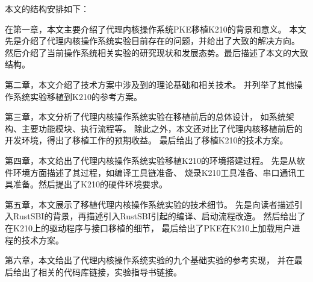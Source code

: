 本文的结构安排如下：

在第一章，本文主要介绍了代理内核操作系统PKE移植K210的背景和意义。
本文先是介绍了代理内核操作系统实验目前存在的问题，并给出了大致的解决方向。
然后介绍了当前操作系统相关实验的研究现状和发展态势。最后描述了本文的大致结构。

第二章，本文介绍了技术方案中涉及到的理论基础和相关技术。
并列举了其他操作系统实验移植到K210的参考方案。

第三章，本文分析了代理内核操作系统实验在移植前后的总体设计，
如系统架构、主要功能模块、执行流程等。
除此之外，本文还对比了代理内核移植前后的开发环境，得出了移植工作的预期收益。
最后给出了移植K210的技术方案。

第四章，本文给出了代理内核操作系统实验移植K210的环境搭建过程。
先是从软件环境方面描述了其过程，如编译工具链准备、
烧录K210工具准备、串口通讯工具准备。然后提出了K210的硬件环境要求。

第五章，本文展示了移植代理内核操作系统实验的技术细节。
先是向读者描述引入RustSBI的背景，再描述引入RustSBI引起的编译、启动流程改造。
然后给出了在K210上的驱动程序与接口移植的细节，
最后给出了PKE在K210上加载用户进程的技术方案。

第六章，本文给出了代理内核操作系统实验的九个基础实验的参考实现，
并在最后给出了相关的代码库链接，实验指导书链接。


